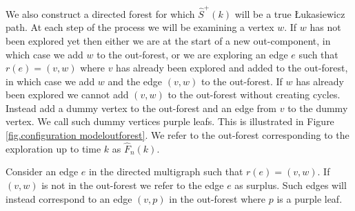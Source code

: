We also construct a directed forest for which $\hat{S}^+(k)$ will be a true \L{}ukasiewicz path. At each step of the process we will be examining a vertex $w$. If $w$ has not been explored yet then either we are at the start of a new out-component, in which case we add $w$ to the out-forest, or we are exploring an edge $e$ such that $r(e) = (v, w)$ where $v$ has already been explored and added to the out-forest, in which case we add $w$ and the edge $(v, w)$ to the out-forest. If $w$ has already been explored we cannot add $(v, w)$ to the out-forest without creating cycles. Instead add a dummy vertex to the out-forest and an edge from $v$ to the dummy vertex. We call such dummy vertices purple leafs. This is illustrated in Figure \ref{fig.configuration modeloutforest}. We refer to the out-forest corresponding to the exploration up to time $k$ as $\hat{F}_n(k)$.

Consider an edge $e$ in the directed multigraph such that $r(e) = (v, w)$. If $(v, w)$ is not in the out-forest we refer to the edge $e$ as surplus. Such edges will instead correspond to an edge $(v, p)$ in the out-forest where $p$ is a purple leaf.

